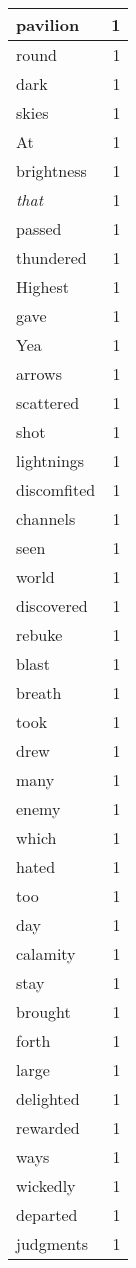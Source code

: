 \begin{center}
\begin{longtable}{l|r}
pavilion & 1 \\ \hline
round & 1 \\ \hline
dark & 1 \\ \hline
skies & 1 \\ \hline
At & 1 \\ \hline
brightness & 1 \\ \hline
\emph{that} & 1 \\ \hline
passed & 1 \\ \hline
thundered & 1 \\ \hline
Highest & 1 \\ \hline
gave & 1 \\ \hline
Yea & 1 \\ \hline
arrows & 1 \\ \hline
scattered & 1 \\ \hline
shot & 1 \\ \hline
lightnings & 1 \\ \hline
discomfited & 1 \\ \hline
channels & 1 \\ \hline
seen & 1 \\ \hline
world & 1 \\ \hline
discovered & 1 \\ \hline
rebuke & 1 \\ \hline
blast & 1 \\ \hline
breath & 1 \\ \hline
took & 1 \\ \hline
drew & 1 \\ \hline
many & 1 \\ \hline
enemy & 1 \\ \hline
which & 1 \\ \hline
hated & 1 \\ \hline
too & 1 \\ \hline
day & 1 \\ \hline
calamity & 1 \\ \hline
stay & 1 \\ \hline
brought & 1 \\ \hline
forth & 1 \\ \hline
large & 1 \\ \hline
delighted & 1 \\ \hline
rewarded & 1 \\ \hline
ways & 1 \\ \hline
wickedly & 1 \\ \hline
departed & 1 \\ \hline
judgments & 1 \\ \hline

\end{longtable}
\end{center}
